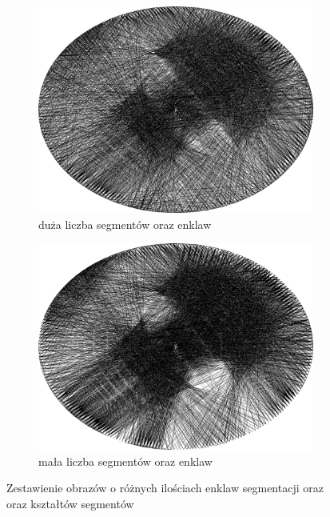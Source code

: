 \documentclass[a4paper, 12pt, polish, twoside]{extreport}
\begin{document}
        \begin{figure}[H] 
        \centering
        \begin{subfigure}{0.49\textwidth}
            \centering
            \includegraphics[width = \textwidth]{img/2-theory/10-jellyfish_b_ellipse_2000_threaded.png}
            \caption{duża liczba segmentów oraz enklaw}
            \label{theory-technics-contrast-thread-jellyfish-a}
        \end{subfigure}
        \begin{subfigure}{0.49\textwidth}
            \centering
            \includegraphics[width = \textwidth]{img/2-theory/20-jellyfish_b_ellipse_2000_threaded.png}
            \caption{mała liczba segmentów oraz enklaw}
            \label{theory-technics-contrast-thread-jellyfish-b}
        \end{subfigure}
        \caption{Zestawienie obrazów o różnych ilościach enklaw segmentacji oraz oraz kształtów segmentów}
        \label{theory-technics-contrast-thread-jellyfish}
        \end{figure}
        
\end{document}
